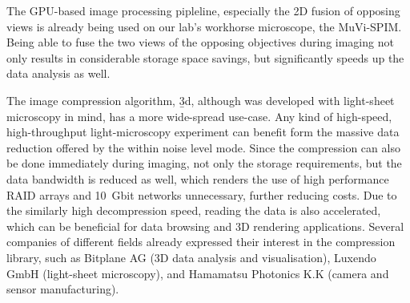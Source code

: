 The GPU-based image processing pipleline, especially the 2D fusion of opposing views is already being used on our lab's workhorse microscope, the MuVi-SPIM. Being able to fuse the two views of the opposing objectives during imaging not only results in considerable storage space savings, but significantly speeds up the data analysis as well.

The image compression algorithm, \b3d, although was developed with light-sheet microscopy in mind, has a more wide-spread use-case. Any kind of high-speed, high-throughput light-microscopy experiment can benefit form the massive data reduction offered by the within noise level mode. Since the compression can also be done immediately during imaging, not only the storage requirements, but the data bandwidth is reduced as well, which renders the use of high performance RAID arrays and \SI{10}{Gbit} networks unnecessary, further reducing costs.
Due to the similarly high decompression speed, reading the data is also accelerated, which can be beneficial for data browsing and 3D rendering applications. Several companies of different fields already expressed their interest in the compression library, such as Bitplane AG (3D data analysis and visualisation), Luxendo GmbH (light-sheet microscopy), and Hamamatsu Photonics K.K (camera and sensor manufacturing).


